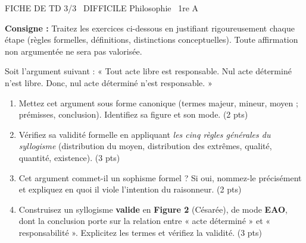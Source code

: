 \documentclass[11pt]{article}
\begin{document}
\begin{tcolorbox}[enhanced,colback=popink,colframe=popink,arc=10pt,boxrule=0pt,left=12pt,right=12pt,top=9pt,bottom=9pt]
{\color{white}\popxbold\small FICHE DE TD 3/3 \textbullet\ DIFFICILE \hfill Philosophie \textbullet\ 1re A\par}
\end{tcolorbox}
\vspace{4pt}
\noindent\textbf{Consigne :} Traitez les exercices ci-dessous en justifiant rigoureusement chaque étape (règles formelles, définitions, distinctions conceptuelles). Toute affirmation non argumentée ne sera pas valorisée.

\begin{exercice}
Soit l'argument suivant : « Tout acte libre est responsable. Nul acte déterminé n'est libre. Donc, nul acte déterminé n'est responsable. »
\begin{enumerate}
    \item Mettez cet argument sous forme canonique (termes majeur, mineur, moyen ; prémisses, conclusion). Identifiez sa figure et son mode. (2 pts)
    \item Vérifiez sa validité formelle en appliquant \textit{les cinq règles générales du syllogisme} (distribution du moyen, distribution des extrêmes, qualité, quantité, existence). (3 pts)
    \item Cet argument commet-il un sophisme formel ? Si oui, nommez-le précisément et expliquez en quoi il viole l'intention du raisonneur. (2 pts)
    \item Construisez un syllogisme \textbf{valide} en \textbf{Figure 2} (Césarée), de mode \textbf{EAO}, dont la conclusion porte sur la relation entre « acte déterminé » et « responsabilité ». Explicitez les termes et vérifiez la validité. (3 pts)
\end{enumerate}
\end{exercice}
\end{document}
